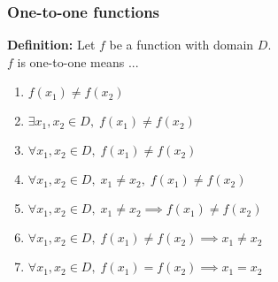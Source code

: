 \documentclass[14pt]{beamer}
\newcommand {\DS} [1] {${\displaystyle #1}$}
\begin{document}
\begin{frame}
\frametitle{One-to-one functions}

{\bf Definition:}  Let $f$ be a function with domain $D$.  \\
$f$ is one-to-one means ...
	\begin{enumerate}
		\item  \DS{f(x_1) \neq f(x_2)}
		\item  \DS{\exists x_1, x_2 \in D, \; f(x_1) \neq f(x_2)}
		\item  \DS{\forall x_1, x_2 \in D, \; f(x_1) \neq f(x_2)}
		\item  \DS{\forall x_1, x_2 \in D, \; x_1 \neq x_2, \; f(x_1) \neq f(x_2)}
		\item  \DS{\forall x_1, x_2 \in D, \; x_1 \neq x_2 \implies  f(x_1) \neq f(x_2)}
		\item  \DS{\forall x_1, x_2 \in D, \; f(x_1) \neq f(x_2) \implies  x_1 \neq x_2}
		\item  \DS{\forall x_1, x_2 \in D, \; f(x_1) = f(x_2) \implies x_1 = x_2}
	\end{enumerate}

\end{frame}
\end{document}
